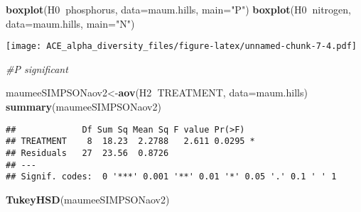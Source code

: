\documentclass[]{article}
\newenvironment{Shaded}{\begin{snugshade}}{\end{snugshade}}
\newcommand{\KeywordTok}[1]{\textcolor[rgb]{0.13,0.29,0.53}{\textbf{#1}}}
\newcommand{\DataTypeTok}[1]{\textcolor[rgb]{0.13,0.29,0.53}{#1}}
\newcommand{\StringTok}[1]{\textcolor[rgb]{0.31,0.60,0.02}{#1}}
\newcommand{\CommentTok}[1]{\textcolor[rgb]{0.56,0.35,0.01}{\textit{#1}}}
\newcommand{\OperatorTok}[1]{\textcolor[rgb]{0.81,0.36,0.00}{\textbf{#1}}}
\newcommand{\NormalTok}[1]{#1}
\begin{document}
\begin{Shaded}
\begin{Highlighting}[]
\KeywordTok{boxplot}\NormalTok{(H0}\OperatorTok{~}\NormalTok{phosphorus, }\DataTypeTok{data=}\NormalTok{maum.hills, }\DataTypeTok{main=}\StringTok{"P"}\NormalTok{)}
\KeywordTok{boxplot}\NormalTok{(H0}\OperatorTok{~}\NormalTok{nitrogen, }\DataTypeTok{data=}\NormalTok{maum.hills, }\DataTypeTok{main=}\StringTok{"N"}\NormalTok{)}
\end{Highlighting}
\end{Shaded}

\texttt{[image: ACE\_alpha\_diversity\_files/figure-latex/unnamed-chunk-7-4.pdf]}

\begin{Shaded}
\begin{Highlighting}[]
\CommentTok{#P significant}

\NormalTok{maumeeSIMPSONaov2<-}\KeywordTok{aov}\NormalTok{(H2}\OperatorTok{~}\NormalTok{TREATMENT, }\DataTypeTok{data=}\NormalTok{maum.hills)}
\KeywordTok{summary}\NormalTok{(maumeeSIMPSONaov2)}
\end{Highlighting}
\end{Shaded}

\begin{verbatim}
##             Df Sum Sq Mean Sq F value Pr(>F)  
## TREATMENT    8  18.23  2.2788   2.611 0.0295 *
## Residuals   27  23.56  0.8726                 
## ---
## Signif. codes:  0 '***' 0.001 '**' 0.01 '*' 0.05 '.' 0.1 ' ' 1
\end{verbatim}

\begin{Shaded}
\begin{Highlighting}[]
\KeywordTok{TukeyHSD}\NormalTok{(maumeeSIMPSONaov2)}
\end{Highlighting}
\end{Shaded}
\end{document}

